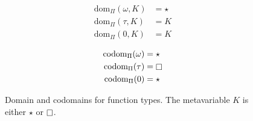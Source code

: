 
\begin{figure}
    \centering
    \begin{minipage}{0.5\textwidth}
        \begin{align*}
            \text{dom}_\Pi(\omega, K) &= \star \\
            \text{dom}_\Pi(\tau, K) &= K \\
            \text{dom}_\Pi(0, K) &= K
        \end{align*}
    \end{minipage}%
    \begin{minipage}{0.5\textwidth}
        \begin{align*}
            \text{codom}_\Pi(\omega) &= \star \\
            \text{codom}_\Pi(\tau) &= \kind \\
            \text{codom}_\Pi(0) &= \star
        \end{align*}
    \end{minipage}
    \caption{Domain and codomains for function types. The metavariable $K$ is either $\star$ or $\kind$.}
\end{figure}
